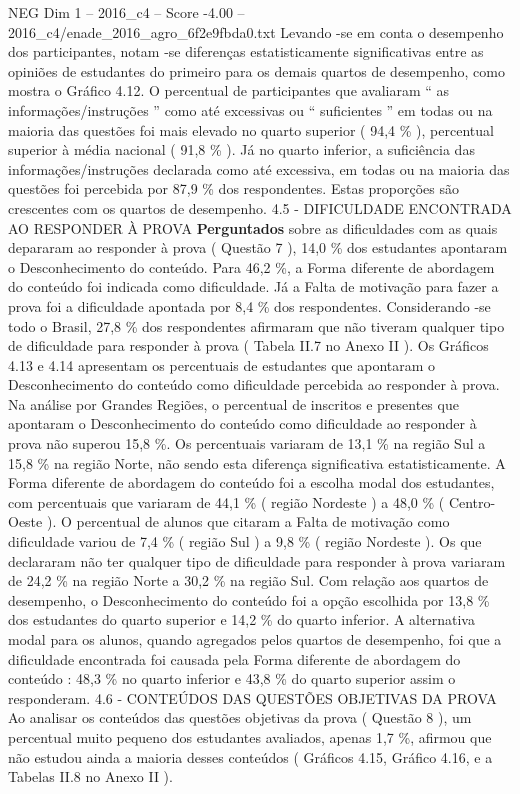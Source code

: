 \begin{textsample}{NEG Dim 1 – 2016\_c4 – Score -4.00 – 2016\_c4/enade\_2016\_agro\_6f2e9fbda0.txt}
Levando -se em conta o desempenho dos participantes, notam -se diferenças estatisticamente significativas entre as opiniões de estudantes do primeiro para os demais quartos de desempenho, como mostra o Gráfico 4.12.
O percentual de participantes que avaliaram “ as informações/instruções ” como até excessivas ou “ suficientes ” em todas ou na maioria das questões foi mais elevado no quarto superior ( 94,4 \% ), percentual superior à média nacional ( 91,8 \% ).
Já no quarto inferior, a suficiência das informações/instruções declarada como até excessiva, em todas ou na maioria das questões foi percebida por 87,9 \% dos respondentes.
Estas proporções são crescentes com os quartos de desempenho. 4.5 - DIFICULDADE ENCONTRADA AO RESPONDER À PROVA \textbf{Perguntados} sobre as dificuldades com as quais depararam ao responder à prova ( Questão 7 ), 14,0 \% dos estudantes apontaram o Desconhecimento do conteúdo.
Para 46,2 \%, a Forma diferente de abordagem do conteúdo foi indicada como dificuldade.
Já a Falta de motivação para fazer a prova foi a dificuldade apontada por 8,4 \% dos respondentes.
Considerando -se todo o Brasil, 27,8 \% dos respondentes afirmaram que não tiveram qualquer tipo de dificuldade para responder à prova ( Tabela II.7 no Anexo II ).
Os Gráficos 4.13 e 4.14 apresentam os percentuais de estudantes que apontaram o Desconhecimento do conteúdo como dificuldade percebida ao responder à prova.
Na análise por Grandes Regiões, o percentual de inscritos e presentes que apontaram o Desconhecimento do conteúdo como dificuldade ao responder à prova não superou 15,8 \%.
Os percentuais variaram de 13,1 \% na região Sul a 15,8 \% na região Norte, não sendo esta diferença significativa estatisticamente.
A Forma diferente de abordagem do conteúdo foi a escolha modal dos estudantes, com percentuais que variaram de 44,1 \% ( região Nordeste ) a 48,0 \% ( Centro-Oeste ).
O percentual de alunos que citaram a Falta de motivação como dificuldade variou de 7,4 \% ( região Sul ) a 9,8 \% ( região Nordeste ).
Os que declararam não ter qualquer tipo de dificuldade para responder à prova variaram de 24,2 \% na região Norte a 30,2 \% na região Sul.
Com relação aos quartos de desempenho, o Desconhecimento do conteúdo foi a opção escolhida por 13,8 \% dos estudantes do quarto superior e 14,2 \% do quarto inferior.
A alternativa modal para os alunos, quando agregados pelos quartos de desempenho, foi que a dificuldade encontrada foi causada pela Forma diferente de abordagem do conteúdo : 48,3 \% no quarto inferior e 43,8 \% do quarto superior assim o responderam. 4.6 - CONTEÚDOS DAS QUESTÕES OBJETIVAS DA PROVA Ao analisar os conteúdos das questões objetivas da prova ( Questão 8 ), um percentual muito pequeno dos estudantes avaliados, apenas 1,7 \%, afirmou que não estudou ainda a maioria desses conteúdos ( Gráficos 4.15, Gráfico 4.16, e a Tabelas II.8 no Anexo II ).

\end{textsample}
